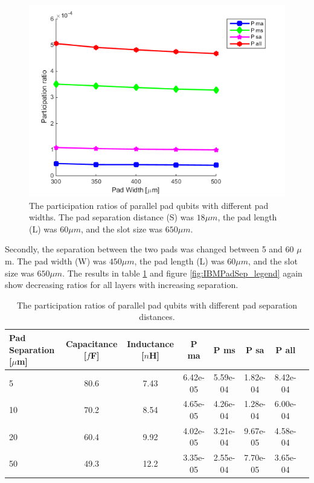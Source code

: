  \begin{figure}
 	\centering
 	\includegraphics[scale = 0.7]{Figures/Ratio_plots/IBMPadWidth_legend}
 	\caption{The participation ratios of parallel pad qubits with different pad widths. The pad separation distance (S) was \(18 \mu m\), the pad length (L) was \(60 \mu m\), and the slot size was \(650 \mu m\).}
 	\label{fig:IBMPadWidth_legend}
 \end{figure}
 
 Secondly, the separation between the two pads was changed between 5 and 60 \(\mu\)m. The pad width (W) was \(450 \mu m\), the pad length (L) was \(60 \mu m\), and the slot size was \(650 \mu m\). The results in table \ref{table:IBMPadSep} and figure \ref{fig:IBMPadSep_legend} again show decreasing ratios for all layers with increasing separation. 
 
 \begin{table}
 	\begin{center}
 		\begin{tabular}{ | l || c | c || c | c | c | c | c |}
 			\hline
 			Pad Separation [\(\mu\)m] & Capacitance [\(f\)F] & Inductance [\(n\)H] & P ma & P ms & P sa & P all \\ \hline
 			5 & 80.6 & 7.43 & 6.42e-05 & 5.59e-04 & 1.82e-04 & 8.42e-04 \\
 			10 & 70.2 & 8.54 & 4.65e-05 & 4.26e-04 & 1.28e-04 & 6.00e-04 \\
 			20 & 60.4 & 9.92 & 4.02e-05 & 3.21e-04 & 9.67e-05 & 4.58e-04 \\
 			50 & 49.3 & 12.2 & 3.35e-05 & 2.55e-04 & 7.70e-05 & 3.65e-04 \\
 			\hline
 		\end{tabular}
 	\end{center}
 	\caption{The participation ratios of parallel pad qubits with different pad separation distances.}
 	\label{table:IBMPadSep}
 \end{table}
 

